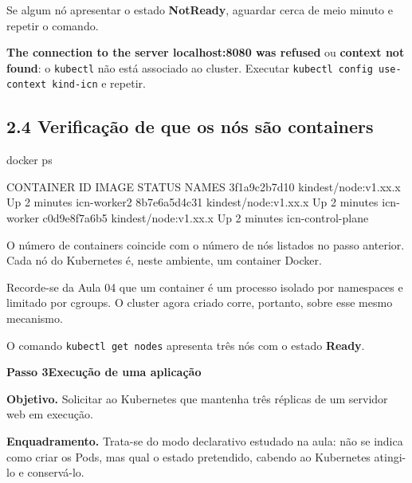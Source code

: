 \documentclass[11pt,a4paper]{article}
\newcommand{\passo}[2]{%
  \clearpage
  \begin{tcolorbox}[colback=SageMuted, colframe=SageMuted, coltext=white,
    boxrule=0pt, arc=4pt, left=14pt, right=14pt, top=10pt, bottom=10pt,
    before skip=0pt, after skip=0.6cm]
  {\Large\bfseries Passo #1}\hfill{\large\bfseries #2}
  \end{tcolorbox}
}
\newcommand{\cmd}[1]{\texttt{#1}}
\begin{document}
Se algum nó apresentar o estado \textbf{NotReady}, aguardar cerca de meio minuto e repetir o comando.

\begin{erro}
\textbf{The connection to the server localhost:8080 was refused} ou \textbf{context not found}: o \cmd{kubectl} não está associado ao cluster. Executar \cmd{kubectl config use-context kind-icn} e repetir.
\end{erro}

\subsection*{2.4 Verificação de que os nós são containers}

\begin{terminal}
docker ps
\end{terminal}

\begin{saida}
CONTAINER ID   IMAGE                  STATUS         NAMES
3f1a9c2b7d10   kindest/node:v1.xx.x   Up 2 minutes   icn-worker2
8b7e6a5d4c31   kindest/node:v1.xx.x   Up 2 minutes   icn-worker
c0d9e8f7a6b5   kindest/node:v1.xx.x   Up 2 minutes   icn-control-plane
\end{saida}

\begin{observe}
O número de containers coincide com o número de nós listados no passo anterior. Cada nó do Kubernetes é, neste ambiente, um container Docker.

Recorde-se da Aula 04 que um container é um processo isolado por namespaces e limitado por cgroups. O cluster agora criado corre, portanto, sobre esse mesmo mecanismo.
\end{observe}

\begin{feito}
O comando \cmd{kubectl get nodes} apresenta três nós com o estado \textbf{Ready}.
\end{feito}

\passo{3}{Execução de uma aplicação}

\textbf{Objetivo.} Solicitar ao Kubernetes que mantenha três réplicas de um servidor web em execução.

\textbf{Enquadramento.} Trata-se do modo declarativo estudado na aula: não se indica como criar os Pods, mas qual o estado pretendido, cabendo ao Kubernetes atingi-lo e conservá-lo.
\end{document}
